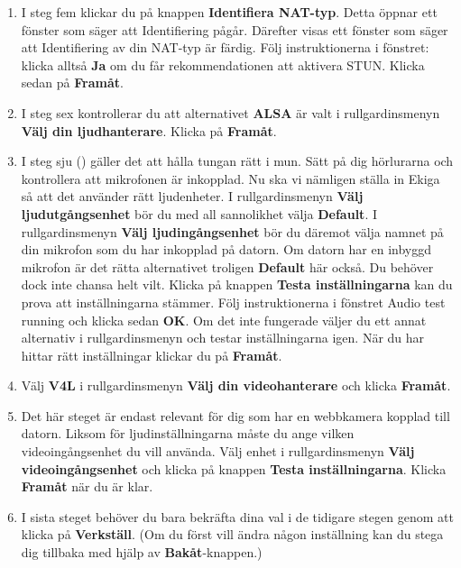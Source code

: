 \documentclass[a4paper,final]{memoir} %
\begin{document}
\begin{enumerate}
\item I steg fem klickar du på knappen \textbf{Identifiera NAT-typ}. Detta öppnar ett fönster som säger att Identifiering pågår. Därefter visas ett fönster som säger att Identifiering av din NAT-typ är färdig. Följ instruktionerna i fönstret: klicka alltså \textbf{Ja} om du får rekommendationen att aktivera STUN. Klicka sedan på \textbf{Framåt}.

\xnegskip{}

\item I steg sex kontrollerar du att alternativet \textbf{ALSA} är valt i rullgardinsmenyn \textbf{Välj din ljudhanterare}. Klicka på \textbf{Framåt}.

\item I steg sju () gäller det att hålla tungan rätt i mun. Sätt på dig hörlurarna och kontrollera att mikrofonen är inkopplad. Nu ska vi nämligen ställa in Ekiga så att det använder rätt ljudenheter. I rullgardinsmenyn \textbf{Välj ljudutgångsenhet} bör du med all sannolikhet välja \textbf{Default}. I rullgardinsmenyn \textbf{Välj ljudingångsenhet} bör du däremot välja namnet på din mikrofon som du har inkopplad på datorn. Om datorn har en inbyggd mikrofon är det rätta alternativet troligen \textbf{Default} här också. Du behöver dock inte chansa helt vilt. Klicka på knappen \textbf{Testa inställningarna} kan du prova att inställningarna stämmer. Följ instruktionerna i fönstret Audio test running och klicka sedan \textbf{OK}. Om det inte fungerade väljer du ett annat alternativ i rullgardinsmenyn och testar inställningarna igen. När du har hittar rätt inställningar klickar du på \textbf{Framåt}.


\item Välj \textbf{V4L} i rullgardinsmenyn \textbf{Välj din videohanterare} och klicka \textbf{Framåt}.

\item Det här steget är endast relevant för dig som har en webbkamera kopplad till datorn. Liksom för ljudinställningarna måste du ange vilken videoingångsenhet du vill använda. Välj enhet i rullgardinsmenyn \textbf{Välj videoingångsenhet} och klicka på knappen \textbf{Testa inställningarna}. Klicka \textbf{Framåt} när du är klar.

\item I sista steget behöver du bara bekräfta dina val i de tidigare stegen genom att klicka på \textbf{Verkställ}. (Om du först vill ändra någon inställning kan du stega dig tillbaka med hjälp av \textbf{Bakåt}-knappen.)

\end{enumerate}
\end{document}
